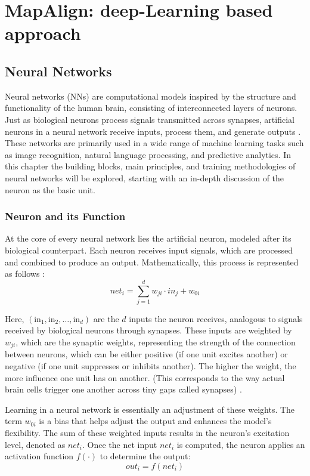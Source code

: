 \NoBgThispage
\chapter{MapAlign: deep-Learning based approach}

\section{Neural Networks}
Neural networks (NNs) are computational models inspired by the structure and functionality of the human brain, consisting of interconnected layers of neurons. Just as biological neurons process signals transmitted across synapses, artificial neurons in a neural network receive inputs, process them, and generate outputs \cite{Grosan2011}. These networks are primarily used in a wide range of machine learning tasks such as image recognition, natural language processing, and predictive analytics.
In this chapter the building blocks, main principles, and training methodologies of neural networks will be explored, starting with an in-depth discussion of the neuron as the basic unit.

\subsection{Neuron and its Function}
At the core of every neural network lies the artificial neuron, modeled after its biological counterpart. Each neuron receives input signals, which are processed and combined to produce an output. Mathematically, this process is represented as follows \cite{10.11648/j.ajnna.20190501.12}:
\begin{equation}
    \textit{net}_i = \sum_{j=1}^{d} w_{ji} \cdot \textit{in}_j + w_{0i}
\end{equation}


Here, $(\text{in}_1, \text{in}_2, \ldots, \text{in}_d)$ are the $d$ inputs the neuron receives, analogous to signals received by biological neurons through synapses. These inputs are weighted by $w_{ji}$, which are the synaptic weights, representing the strength of the connection between neurons, which can be either positive (if one
unit excites another) or negative (if one unit suppresses or
inhibits another). The higher the weight, the more influence
one unit has on another. (This corresponds to the way actual
brain cells trigger one another across tiny gaps called synapses) \cite{10.11648/j.ajnna.20190501.12}.

Learning in a neural network is essentially an adjustment of these weights. The term $w_{0i}$ is a bias that helps adjust the output and enhances the model's flexibility. The sum of these weighted inputs results in the neuron’s excitation level, denoted as $\textit{net}_i$.
Once the net input ${net}_i$ is computed, the neuron applies an activation function $f(\cdot)$ to determine the output:
\begin{equation}
    \textit{out}_i = f(\textit{net}_i)
\end{equation}

